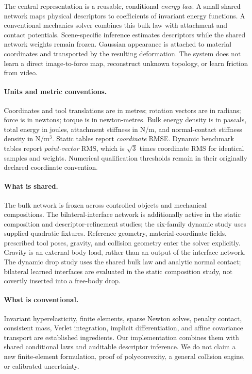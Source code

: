 \documentclass[10pt,twocolumn,letterpaper]{article}
\begin{document}
The central representation is a reusable, conditional \emph{energy law}. A small shared network maps physical descriptors to coefficients of invariant energy functions. A conventional mechanics solver combines this bulk law with attachment and contact potentials. Scene-specific inference estimates descriptors while the shared network weights remain frozen. Gaussian appearance is attached to material coordinates and transported by the resulting deformation. The system does not learn a direct image-to-force map, reconstruct unknown topology, or learn friction from video.

\paragraph{Units and metric conventions.}
Coordinates and tool translations are in metres; rotation vectors are in radians; force is in newtons; torque is in newton-metres. Bulk energy density is in pascals, total energy in joules, attachment stiffness in N/m, and normal-contact stiffness density in N/m$^3$. Static tables report \emph{coordinate} RMSE. Dynamic benchmark tables report \emph{point-vector} RMS, which is $\sqrt{3}$ times coordinate RMS for identical samples and weights. Numerical qualification thresholds remain in their originally declared coordinate convention.

\paragraph{What is shared.}
The bulk network is frozen across controlled objects and mechanical compositions. The bilateral-interface network is additionally active in the static composition and descriptor-refinement studies; the six-family dynamic study uses supplied quadratic fixtures. Reference geometry, material-coordinate fields, prescribed tool poses, gravity, and collision geometry enter the solver explicitly. Gravity is an external body load, rather than an output of the interface network. The dynamic drop study uses the shared bulk law and analytic normal contact; bilateral learned interfaces are evaluated in the static composition study, not covertly inserted into a free-body drop.

\paragraph{What is conventional.}
Invariant hyperelasticity, finite elements, sparse Newton solves, penalty contact, consistent mass, Verlet integration, implicit differentiation, and affine covariance transport are established ingredients. Our implementation combines them with shared conditional laws and auditable descriptor inference. We do not claim a new finite-element formulation, proof of polyconvexity, a general collision engine, or calibrated uncertainty.
\end{document}
